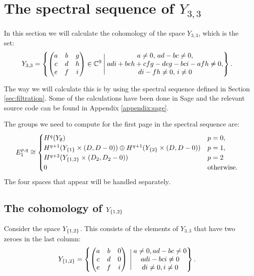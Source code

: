 \section{The spectral sequence of $Y_{3,3}$}
\label{sec:ss33}


In this section we will calculate the cohomology of the space
$Y_{3,3}$, which is the set:
\[ Y_{3,3} = \left\{ 
  \begin{pmatrix}
    a & b & g \\
    c & d & h \\
    e & f & i
  \end{pmatrix} \in \mathbb{C}^9 \:\Bigg\vert\: 
  \begin{matrix}
    a\neq 0,\, ad-bc \neq 0, \\
    adi+beh+cfg-deg-bci-afh \neq 0, \\
    di-fh \neq 0,\, i \neq 0
  \end{matrix}  \right\}. \]

The way we will calculate this is by using the spectral sequence
defined in Section \ref{sec:filtration}. Some of the calculations have
been done in Sage and the relevant source code can be found in
Appendix \ref{appendix:sage}.


The groups we need to compute for the first page in the spectral
sequence are:
\[ E_1^{p,q} \cong
\begin{cases}
  H^{q}(Y_\emptyset) & p=0, \\
  H^{q+1}(Y_{\left\{ 1 \right\}} \times (D,D-0)) \oplus H^{q+1}(Y_{\left\{ 2 \right\}} \times
  (D,D-0)) & p=1, \\
  H^{q+2}(Y_{\left\{ 1,2 \right\}}\times (D_2,D_2-0)) & p = 2 \\
  0 & \text{otherwise}.
\end{cases} \]
The four spaces that appear will be handled separately.

\subsection{The cohomology of $Y_{\left\{ 1,2 \right\}}$}

Consider the space $Y_{\left\{ 1,2 \right\}}$. This consists of the elements of
$Y_{3,3}$ that have two zeroes in the last column:
\[ Y_{\left\{ 1,2 \right\}} = \left\{ 
  \begin{pmatrix}
    a & b & 0 \\
    c & d & 0 \\
    e & f & i
  \end{pmatrix} \:\Bigg\vert\:
  \begin{matrix}
    a \neq 0, ad-bc \neq 0 \\
    adi-bci \neq 0 \\
    di \neq 0, i \neq 0
  \end{matrix}
 \right\}. \]

